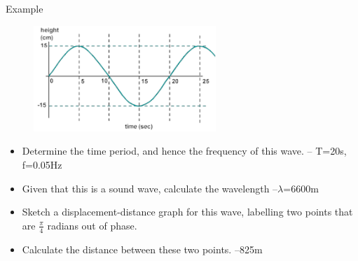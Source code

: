 \documentclass[../Main.tex]{subfiles}
\begin{document}
\begin{frame}{Example}
\begin{exampleblock}{}
    \begin{figure}
        \centering
        \includegraphics[height=4cm]{Waves_Images/example_wave_question.png}
    \end{figure}
    
    \begin{itemize}
        \item Determine the time period, and hence the frequency of this wave. \pause 
        -- T=20s, f=0.05Hz
        \item Given that this is a sound wave, calculate the wavelength \pause
        --$\lambda$=6600m
        \item Sketch a displacement-distance graph for this wave, labelling two points that are $\frac{\pi}{4}$ radians out of phase. \pause
        \item Calculate the distance between these two points. \pause
        --825m
    \end{itemize}
    \end{exampleblock} 
\end{frame}
\end{document}
